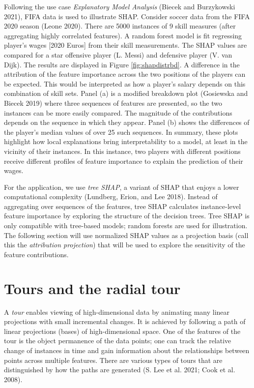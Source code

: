 \documentclass[
]{article}
\begin{document}
Following the use case \emph{Explanatory Model Analysis} (Biecek and Burzykowski 2021), FIFA data is used to illustrate SHAP. Consider soccer data from the FIFA 2020 season (Leone 2020). There are 5000 instances of 9 skill measures (after aggregating highly correlated features). A random forest model is fit regressing player's wages {[}2020 Euros{]} from their skill measurements. The SHAP values are compared for a star offensive player (L. Messi) and defensive player (V. van Dijk). The results are displayed in Figure \ref{fig:shapdistrbd}. A difference in the attribution of the feature importance across the two positions of the players can be expected. This would be interpreted as how a player's salary depends on this combination of skill sets. Panel (a) is a modified breakdown plot (Gosiewska and Biecek 2019) where three sequences of features are presented, so the two instances can be more easily compared. The magnitude of the contributions depends on the sequence in which they appear. Panel (b) shows the differences of the player's median values of over 25 such sequences. In summary, these plots highlight how local explanations bring interpretability to a model, at least in the vicinity of their instances. In this instance, two players with different positions receive different profiles of feature importance to explain the prediction of their wages.

For the application, we use \emph{tree SHAP}, a variant of SHAP that enjoys a lower computational complexity (Lundberg, Erion, and Lee 2018). Instead of aggregating over sequences of the features, tree SHAP calculates instance-level feature importance by exploring the structure of the decision trees. Tree SHAP is only compatible with tree-based models; random forests are used for illustration. The following section will use normalized SHAP values as a projection basis (call this the \emph{attribution projection}) that will be used to explore the sensitivity of the feature contributions.

\hypertarget{sec:tour}{%
\section{Tours and the radial tour}\label{sec:tour}}

A \emph{tour} enables viewing of high-dimensional data by animating many linear projections with small incremental changes. It is achieved by following a path of linear projections (bases) of high-dimensional space. One of the features of the tour is the object permanence of the data points; one can track the relative change of instances in time and gain information about the relationships between points across multiple features. There are various types of tours that are distinguished by how the paths are generated (S. Lee et al. 2021; Cook et al. 2008).
\end{document}
